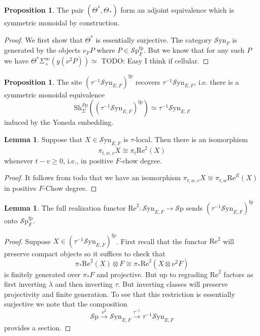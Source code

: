 \documentclass[10pt]{amsart}
\theoremstyle{definition}
\numberwithin{figure}{section}
\numberwithin{equation}{section}
\newtheorem{lemma}[figure]{Lemma}
\newtheorem{proposition}[figure]{Proposition}
\theoremstyle{cited}
\newcommand{\Sp}{{\mathcal{S}\mathrm{p}}}
\newcommand{\Sh}{\mathrm{Sh}}
\newcommand{\fp}{\mathrm{fp}}
\newcommand{\Syn}{\mathcal{S}\mathrm{yn}}
\renewcommand{\Re}{\mathrm{Re}}
\begin{document}
\begin{proposition}
  The pair $(\Theta^*,\Theta_*)$ form an adjoint equivalence which is symmetric monoidal by construction.
\end{proposition}

\begin{proof}
  We first show that $\Theta^*$ is essentially surjective. The category $\Syn_F$ is generated by the objects $\nu_F P$ where $P\in \Sp^\fp_F$. But we know that for any such $P$ we have $\Theta^*\Sigma^\infty_+(y(\nu^2P))\simeq $ TODO: Easy I think if cellular.
\end{proof}

\begin{proposition}
  The site $(\tau^{-1}\Syn_{E,F})^\fp$ recovers $\tau^{-1}\Syn_{E,F}$, i.e. there is a symmetric monoidal equivalence 
  \[
    \Sh_\Sigma^\Sp((\tau^{-1}\Syn_{E,F})^\fp) \simeq \tau^{-1}\Syn_{E,F}
  \]
  induced by the Yoneda embedding.
\end{proposition}

\newpage

\begin{lemma}
  Suppose that $X\in \Syn_{E,F}$ is $\tau$-local. Then there is an isomorphism
  \[
    \pi_{t,w,v}X \cong \pi_{t}\Re^2(X)
  \]
  whenever $t-v\geq 0$, i.e., in positive $F$-chow degree.
\end{lemma}

\begin{proof}
  It follows from todo that we have an isomorphism $\pi_{t,w,v}X\cong \pi_{t,w}\Re^E(X)$ in positive $F$-Chow degree.
\end{proof}

\begin{lemma}
  \label{lem:taulocalfptoffp}
  The full realization functor $\Re^2:\Syn_{E,F}\to \Sp$ sends $(\tau^{-1}\Syn_{E,F})^\fp$ onto $\Sp^\fp_F$.
\end{lemma}

\begin{proof}
  Suppose $X\in (\tau^{-1}\Syn_{E,F})^\fp$. First recall that the functor $\Re^2$ will preserve compact objects so it suffices to check that
  \[
  \pi_*\Re^2(X)\otimes F \cong \pi_*\Re^2(X\otimes \nu^2 F)
  \]
  is finitely generated over $\pi_*F$ and projective. But up to regrading $\Re^2$ factors as first inverting $\lambda$ and then inverting $\tau$. But inverting classes will preserve projectivity and finite generation. To see that this restriction is essentially surjective we note that the composition
  \[
  \Sp \xrightarrow{\nu^2} \Syn_{E,F}\xrightarrow{\tau^{-1}}\tau^{-1}\Syn_{E,F}
  \]
  provides a section. %
\end{proof}
\end{document}
